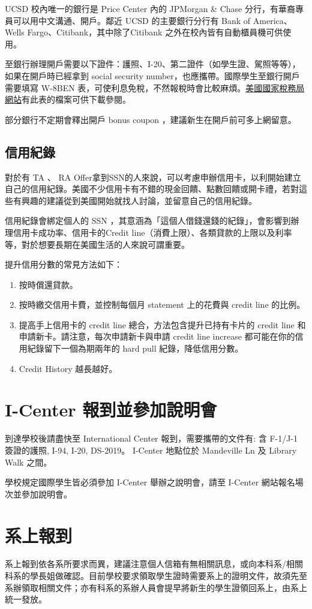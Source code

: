 \documentclass[10pt,a4paper]{book}
\begin{document}
\begin{CJK}{UTF8}{bkai}
UCSD 校內唯一的銀行是 Price Center 內的 JPMorgan \& Chase 分行，有華裔專員可以用中文溝通、開戶。鄰近 UCSD 的主要銀行分行有 Bank of America、Wells Fargo、Citibank，其中除了Citibank 之外在校內皆有自動櫃員機可供使用。

至銀行辦理開戶需要以下證件：護照、I-20、第二證件（如學生證、駕照等等），如果在開戶時已經拿到 social security number，也應攜帶。國際學生至銀行開戶需要填寫 W-8BEN 表，可使利息免稅，不然報稅時會比較麻煩。\href{http://www.irs.gov}{美國國家稅務局網站}有此表的檔案可供下載參閱。

部分銀行不定期會釋出開戶 bonus coupon ，建議新生在開戶前可多上網留意。

\subsection{信用紀錄}
對於有 TA 、 RA Offer拿到SSN的人來說，可以考慮申辦信用卡，以利開始建立自己的信用紀錄。美國不少信用卡有不錯的現金回饋、點數回饋或開卡禮，若對這些有興趣的建議從到美國開始就找人討論，並留意自己的信用紀錄。

信用紀錄會綁定個人的 SSN ，其意涵為「這個人借錢還錢的紀錄」，會影響到辦理信用卡成功率、信用卡的Credit line（消費上限）、各類貸款的上限以及利率等，對於想要長期在美國生活的人來說可謂重要。

提升信用分數的常見方法如下：
\begin{enumerate}
\item 按時償還貸款。
\item 按時繳交信用卡費，並控制每個月 statement 上的花費與 credit line 的比例。
\item 提高手上信用卡的 credit line 總合，方法包含提升已持有卡片的 credit line 和申請新卡。請注意，每次申請新卡與申請 credit line increase 都可能在你的信用紀錄留下一個為期兩年的 hard pull 紀錄，降低信用分數。
\item Credit History 越長越好。
\end{enumerate}

\section{I-Center 報到並參加說明會}
到達學校後請盡快至 International Center 報到，需要攜帶的文件有: 含 F-1/J-1 簽證的護照, I-94, I-20, DS-2019。 I-Center 地點位於 Mandeville Ln 及 Library Walk 之間。

學校規定國際學生皆必須參加 I-Center 舉辦之說明會，請至 I-Center 網站報名場次並參加說明會。

\section{系上報到}
系上報到依各系所要求而異，建議注意個人信箱有無相關訊息，或向本科系/相關科系的學長姐做確認。目前學校要求領取學生證時需要系上的證明文件，故須先至系辦領取相關文件；亦有科系的系辦人員會提早將新生的學生證領回系上，由系上統一發放。


\end{CJK}
\end{document}
